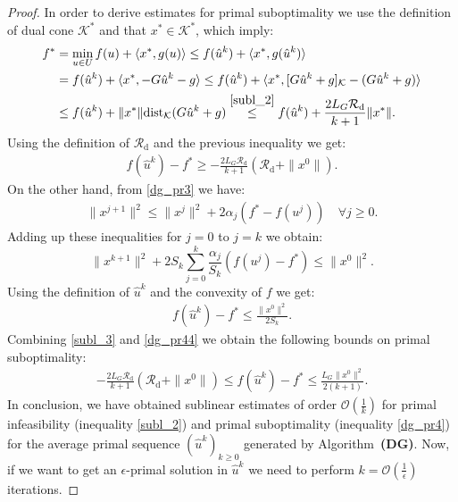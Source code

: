 \documentclass{gOMS2e}
\theoremstyle{plain}
\theoremstyle{definition}
\theoremstyle{remark}
\providecommand{\norm}[1]{\lVert#1\rVert}
\begin{document}
\begin{proof}
\noindent In order to derive estimates for primal suboptimality we
use the definition of dual cone ${\mathcal{K}}^*$ and that $x^* \in {\mathcal{K}}^*$,
which imply:
\begin{align*}
f^* &=  \min_{u \in U} f(u) + \langle x^*, g(u) \rangle \leq f(\hat
u^k) + \langle x^*, g(\hat u^k) \rangle \\
& =  f(\hat u^k) + \langle x^*, -G \hat u^k - g \rangle \leq f(\hat
u^k) + \langle x^*,  [G \hat u^k + g]_{\mathcal{K}} - (G \hat u^k + g)
\rangle \\
& \leq f(\hat u^k) + \norm{x^*} \text{dist}_{\mathcal{K}}(G\hat{u}^k
+ g)  \overset{\eqref{subl_2}}{\leq} f(\hat u^k) +  \frac{2 L_G
\mathcal{R}_\text{d}}{k+1}  \|x^*\|.
\end{align*}
Using the definition of $\mathcal{R}_\text{d}$ and the previous
inequality  we get:
\begin{align}
\label{subl_3}  f(\hat u^k) - f^* \geq -  \frac{2 L_G
\mathcal{R}_\text{d}}{k+1}(\mathcal{R}_\text{d} + \|x^0\|).
\end{align}
On the other hand, from \eqref{dg_pr3} we have:
\begin{align*}
\|x^{j+1}\|^2 \leq \|x^j\|^2 + 2 \alpha_j (f^* - f(u^j)) \quad
\forall j \geq 0.
\end{align*}
Adding up these inequalities for $j=0$ to $j=k$ we obtain:
\[ \|x^{k+1}\|^2 + 2S_k \sum_{j=0}^k \frac{\alpha_j}{S_k}(f(u^j) - f^*) \leq  \|x^0\|^2.   \]
Using the definition of $\hat u^k$ and the convexity of $f$ we get:
\begin{align}
\label{dg_pr44} f(\hat u^k) - f^*
  \leq   \frac{\|x^0\|^2}{2S_k}.
\end{align}
Combining \eqref{subl_3} and  \eqref{dg_pr44} we  obtain the
following  bounds on primal suboptimality:
\begin{align}
\label{dg_pr4} -  \frac{2 L_G \mathcal{R}_\text{d}}{k+1}
(\mathcal{R}_\text{d} + \|x^0\|) \leq f(\hat u^k) - f^* \leq
\frac{L_G \|x^0\|^2}{2(k+1)}.
\end{align}
In conclusion, we have obtained sublinear estimates  of order
$\mathcal{O}(\frac{1}{k})$ for primal infeasibility (inequality
\eqref{subl_2}) and primal suboptimality (inequality \eqref{dg_pr4})
for the average primal  sequence $(\hat u^k)_{k \geq 0}$ generated
by Algorithm~\textbf{(DG)}. Now, if we want to get an
$\epsilon$-primal solution in $\hat u^k$ we need to perform $k =
{\mathcal O} (\frac{1}{\epsilon})$ iterations.
\end{proof}
\end{document}
